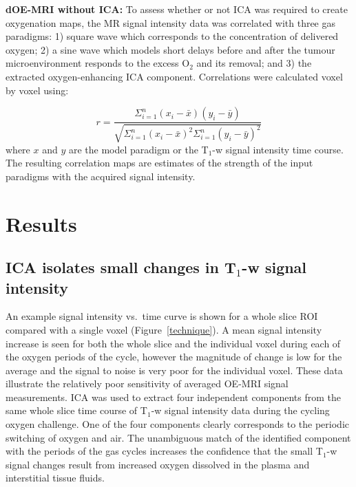 \noindent\textbf{dOE-MRI without ICA:} To assess whether or not ICA was required to create oxygenation maps, the MR signal intensity data was correlated with three gas paradigms: 1) square wave which corresponds to the concentration of delivered oxygen; 2) a sine wave which models short delays before and after the tumour microenvironment responds to the excess O$_2$ and its removal; and 3) the extracted oxygen-enhancing ICA component.
Correlations were calculated voxel by voxel using:

\begin{equation}
r = \frac{\Sigma^n_{i=1} (x_i - \bar{x}) (y_i - \bar{y})}{\sqrt{\Sigma^n_{i=1} (x_i - \bar{x})^2 \Sigma^n_{i=1} (y_i - \bar{y})^2}}
\end{equation}
where $x$ and $y$ are the model paradigm or the T$_1$-w signal intensity time course.
The resulting correlation maps are estimates of the strength of the input paradigms with the acquired signal intensity.


\section{Results}

\subsection{ICA isolates small changes in T$_1$-w signal intensity}

An example signal intensity vs.\ time curve is shown for a whole slice ROI compared with a single voxel (Figure~\ref{technique}).
A mean signal intensity increase is seen for both the whole slice and the individual voxel during each of the oxygen periods of the cycle, however the magnitude of change is low for the average and the signal to noise is very poor for the individual voxel.
These data illustrate the relatively poor sensitivity of averaged OE-MRI signal measurements.
ICA was used to extract four independent components from the same whole slice time course of T$_1$-w signal intensity data during the cycling oxygen challenge.
One of the four components clearly corresponds to the periodic switching of oxygen and air.
The unambiguous match of the identified component with the periods of the gas cycles increases the confidence that the small T$_1$-w signal changes result from increased oxygen dissolved in the plasma and interstitial tissue fluids.
    

